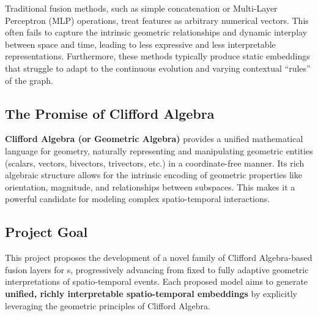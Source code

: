 \documentclass[11pt]{article}
\newcommand{\STG}{\text{CTDSTG}} %
\begin{document}
Traditional fusion methods, such as simple concatenation or Multi-Layer Perceptron (MLP) operations, treat features as arbitrary numerical vectors. This often fails to capture the intrinsic geometric relationships and dynamic interplay between space and time, leading to less expressive and less interpretable representations. Furthermore, these methods typically produce static embeddings that struggle to adapt to the continuous evolution and varying contextual ``rules'' of the graph.

\subsection{The Promise of Clifford Algebra}
\textbf{Clifford Algebra (or Geometric Algebra)} provides a unified mathematical language for geometry, naturally representing and manipulating geometric entities (scalars, vectors, bivectors, trivectors, etc.) in a coordinate-free manner. Its rich algebraic structure allows for the intrinsic encoding of geometric properties like orientation, magnitude, and relationships between subspaces. This makes it a powerful candidate for modeling complex spatio-temporal interactions.

\subsection{Project Goal}
This project proposes the development of a novel family of Clifford Algebra-based fusion layers for \STG s, progressively advancing from fixed to fully adaptive geometric interpretations of spatio-temporal events. Each proposed model aims to generate \textbf{unified, richly interpretable spatio-temporal embeddings} by explicitly leveraging the geometric principles of Clifford Algebra.
\end{document}
